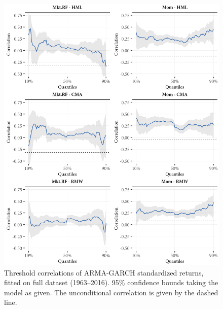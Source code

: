 \begin{figure}[!ht]
  \centering

  \includegraphics[scale=1]{graphics/threshold1.png}

  \caption{Threshold correlations of ARMA-GARCH standardized returns, fitted on full dataset (1963--2016). 95\% confidence bounds taking the model as given. The unconditional correlation is given by the dashed line.}
  \label{fig:threshold1}
\end{figure}

